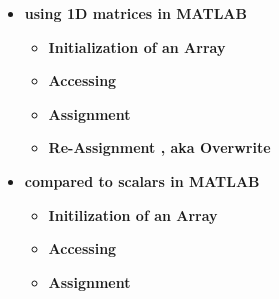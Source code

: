 \documentclass[11pt]{article}
\newcommand{\B}{\color{blue}}
\newcommand{\GR}{\color{mygreen}}
\newcommand{\PR}{\color{mypurple}}
\begin{document}
\begin{itemize}
\begin{multicols}{2}
\begin{tabular}{ | l | c | r | }
        \end{tabular}	 
	
	\vspace{2mm}
        This one contains a 1-D matrix called {\GR squares} and 4 scalars.
        \end{multicols}
		
		\newpage
	\item \textbf{ \LARGE using {\PR 1D matrices} in MATLAB }\\
	
		
		\begin{itemize}
			\item \textbf{ \Large Initialization of an Array } \\  \vspace{30mm}
            			
            		\item \textbf{ \Large Accessing } \\  \vspace{30mm}	
            				
            		\item \textbf{ \Large Assignment } \\  \vspace{30mm}			
            				
			\item \textbf{ \Large Re-Assignment , aka Overwrite} \\  \vspace{30mm}			

		\end{itemize}

		\newpage
	\item \textbf{ \LARGE compared to {\B scalars} in MATLAB  }\\
	
		
		\begin{itemize}
			\item \textbf{ \Large Initilization of an Array } \\  \vspace{30mm}
            			
            		\item \textbf{ \Large Accessing } \\  \vspace{30mm}	
            				
            		\item \textbf{ \Large Assignment } \\  \vspace{30mm}			
            				

\end{itemize}
\end{itemize}
\end{document}
